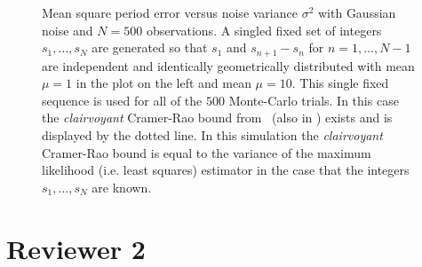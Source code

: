 \documentclass[a4paper,10pt]{article}
\begin{document}
\begin{figure}[tp]
  \caption{Mean square period error versus noise variance $\sigma^2$ with Gaussian noise and $N=500$ observations.  A singled fixed set of integers $s_1,\dots,s_N$ are generated so that $s_1$ and $s_{n+1} - s_n$ for $n=1,\dots,N-1$ are independent and identically geometrically distributed with mean $\mu = 1$ in the plot on the left and mean $\mu=10$.  This single fixed sequence is used for all of the $500$ Monte-Carlo trials.  In this case the \emph{clairvoyant} Cramer-Rao bound from~\cite{Sidiropoulos2005} (also in \cite{726812,Clarkson2007}) exists and is displayed by the dotted line.  In this simulation the \emph{clairvoyant} Cramer-Rao bound is equal to the variance of the maximum likelihood (i.e. least squares) estimator in the case that the integers $s_1,\dots,s_N$ are known.}\label{plot:crb}
\end{figure} 


\section*{Reviewer 2}
\end{document}
